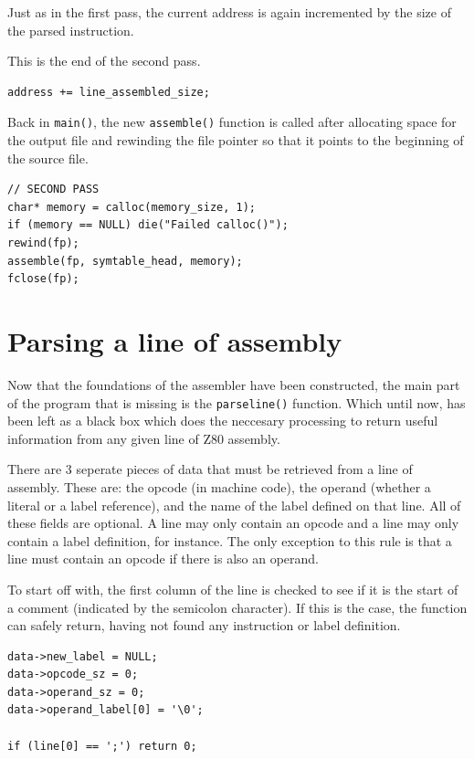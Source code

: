 \documentclass[a4paper]{report}
\begin{document}
Just as in the first pass, the current address is again incremented by the size
of the parsed instruction.

This is the end of the second pass.

\begin{lstlisting}
address += line_assembled_size;
\end{lstlisting}

Back in \texttt{main()}, the new \texttt{assemble()} function is called after
allocating space for the output file and rewinding the file pointer so that it
points to the beginning of the source file.

\begin{lstlisting}
// SECOND PASS
char* memory = calloc(memory_size, 1);
if (memory == NULL) die("Failed calloc()");
rewind(fp);
assemble(fp, symtable_head, memory);
fclose(fp);
\end{lstlisting}

\section{Parsing a line of assembly}

Now that the foundations of the assembler have been constructed, the main part
of the program that is missing is the \texttt{parseline()} function. Which until
now, has been left as a black box which does the neccesary processing to return
useful information from any given line of Z80 assembly.

There are 3 seperate pieces of data that must be retrieved from a line of
assembly. These are: the opcode (in machine code), the operand (whether a
literal or a label reference), and the name of the label defined on that line.
All of these fields are optional. A line may only contain an opcode and a line
may only contain a label definition, for instance. The only exception to this
rule is that a line must contain an opcode if there is also an operand.

To start off with, the first column of the line is checked to see if it is the
start of a comment (indicated by the semicolon character). If this is the case,
the function can safely return, having not found any instruction or label
definition.

\begin{lstlisting}
data->new_label = NULL;
data->opcode_sz = 0;
data->operand_sz = 0;
data->operand_label[0] = '\0';

if (line[0] == ';') return 0;
\end{lstlisting}
\end{document}
